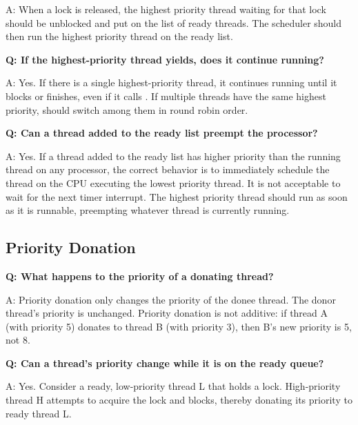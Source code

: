 A: When a lock is released, the highest priority thread waiting for that lock should be unblocked 
and put on the list of ready threads. The scheduler should then run the highest priority thread on
the ready list.

\newline

\textbf{Q: If the highest-priority thread yields, does it continue running?}

A: Yes. If there is a single highest-priority thread, it continues running until it blocks or 
finishes, even if it calls . If multiple threads have the same highest priority,
 should switch among them in round robin order.

\newline

\textbf{Q: Can a thread added to the ready list preempt the processor?}

A: Yes. If a thread added to the ready list has higher priority than the running thread on any
processor, the correct behavior is to immediately schedule the thread on the CPU executing the
lowest priority thread. It is not acceptable to wait for the next timer interrupt. The highest
priority thread should run as soon as it is runnable, preempting whatever thread is currently
running.

\newline

\subsection{Priority Donation}

\textbf{Q: What happens to the priority of a donating thread?}

A: Priority donation only changes the priority of the donee thread. The donor thread’s priority is 
unchanged. Priority donation is not additive: if thread A (with priority 5) donates to thread B 
(with priority 3), then B’s new priority is 5, not 8.

\newline

\textbf{Q: Can a thread’s priority change while it is on the ready queue?}

A: Yes. Consider a ready, low-priority thread L that holds a lock. High-priority thread H attempts 
to acquire the lock and blocks, thereby donating its priority to ready thread L.

\newline

